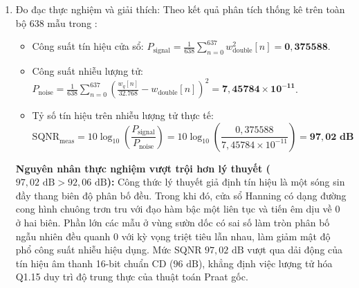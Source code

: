\begin{enumerate}[label=(\alph*)]
    \item Đo đạc thực nghiệm và giải thích:
    Theo kết quả phân tích thống kê trên toàn bộ $638\text{ mẫu}$ trong :
    \begin{itemize}[leftmargin=1.5em, itemsep=2pt]
        \item Công suất tín hiệu cửa sổ: $P_{\text{signal}} = \frac{1}{638} \sum_{n=0}^{637} w_{\text{double}}^2[n] = \mathbf{0{,}375588}$.
        \item Công suất nhiễu lượng tử: $P_{\text{noise}} = \frac{1}{638} \sum_{n=0}^{637} \left( \frac{w_q[n]}{32.768} - w_{\text{double}}[n] \right)^2 = \mathbf{7{,}45784 \times 10^{-11}}$.
        \item Tỷ số tín hiệu trên nhiễu lượng tử thực tế:
        \begin{equation}
        \text{SQNR}_{\text{meas}} = 10 \log_{10}\left( \frac{P_{\text{signal}}}{P_{\text{noise}}} \right) = 10 \log_{10}\left( \frac{0{,}375588}{7{,}45784 \times 10^{-11}} \right) = \mathbf{97{,}02\text{ dB}}
        \end{equation}
    \end{itemize}
    \textbf{Nguyên nhân thực nghiệm vượt trội hơn lý thuyết ($97{,}02\text{ dB} > 92{,}06\text{ dB}$):} 
    Công thức lý thuyết giả định tín hiệu là một sóng sin đầy thang biên độ phân bố đều. Trong khi đó, cửa sổ Hanning có dạng đường cong hình chuông trơn tru với đạo hàm bậc một liên tục và tiến êm dịu về 0 ở hai biên. Phần lớn các mẫu ở vùng sườn dốc có sai số làm tròn phân bố ngẫu nhiên đều quanh 0 với kỳ vọng triệt tiêu lẫn nhau, làm giảm mật độ phổ công suất nhiễu hiệu dụng. Mức SQNR $97{,}02\text{ dB}$ vượt qua dải động của tín hiệu âm thanh 16-bit chuẩn CD ($96\text{ dB}$), khẳng định việc lượng tử hóa Q1.15 duy trì độ trung thực của thuật toán Praat gốc.
\end{enumerate}

